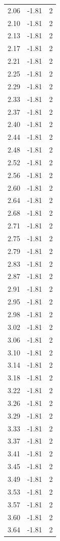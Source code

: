 \begin{longtable}{lrr}
  2.06 & -1.81 & 2 \\
  2.10 & -1.81 & 2 \\
  2.13 & -1.81 & 2 \\
  2.17 & -1.81 & 2 \\
  2.21 & -1.81 & 2 \\
  2.25 & -1.81 & 2 \\
  2.29 & -1.81 & 2 \\
  2.33 & -1.81 & 2 \\
  2.37 & -1.81 & 2 \\
  2.40 & -1.81 & 2 \\
  2.44 & -1.81 & 2 \\
  2.48 & -1.81 & 2 \\
  2.52 & -1.81 & 2 \\
  2.56 & -1.81 & 2 \\
  2.60 & -1.81 & 2 \\
  2.64 & -1.81 & 2 \\
  2.68 & -1.81 & 2 \\
  2.71 & -1.81 & 2 \\
  2.75 & -1.81 & 2 \\
  2.79 & -1.81 & 2 \\
  2.83 & -1.81 & 2 \\
  2.87 & -1.81 & 2 \\
  2.91 & -1.81 & 2 \\
  2.95 & -1.81 & 2 \\
  2.98 & -1.81 & 2 \\
  3.02 & -1.81 & 2 \\
  3.06 & -1.81 & 2 \\
  3.10 & -1.81 & 2 \\
  3.14 & -1.81 & 2 \\
  3.18 & -1.81 & 2 \\
  3.22 & -1.81 & 2 \\
  3.26 & -1.81 & 2 \\
  3.29 & -1.81 & 2 \\
  3.33 & -1.81 & 2 \\
  3.37 & -1.81 & 2 \\
  3.41 & -1.81 & 2 \\
  3.45 & -1.81 & 2 \\
  3.49 & -1.81 & 2 \\
  3.53 & -1.81 & 2 \\
  3.57 & -1.81 & 2 \\
  3.60 & -1.81 & 2 \\
  3.64 & -1.81 & 2 \\

\end{longtable}
